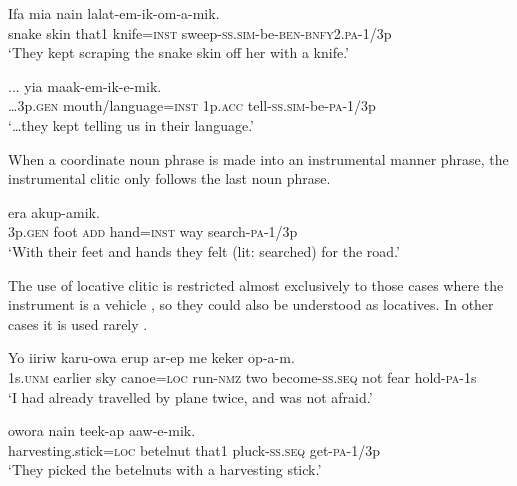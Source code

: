 \ea%
\label{ex:4:x886}
\gll Ifa  mia  nain    lalat-em-ik-om-a-mik. \\
  snake  skin  that1  knife=\textsc{inst}  sweep-\textsc{ss}.\textsc{sim}-be-\textsc{ben}-\textsc{bnfy}2.\textsc{pa}-1/3p    \\
\glt`They kept scraping the snake skin off her with a knife.'
\z

\ea%
\label{ex:4:x889}
\gll ...   yia  maak-em-ik-e-mik. \\
 {\dots}3p.\textsc{gen}  mouth/language=\textsc{inst}  1p.\textsc{acc}  tell-\textsc{ss}.\textsc{sim}-be-\textsc{pa}-1/3p     \\
\glt`{\dots}they kept telling us in their language.'
\z

When a coordinate noun phrase is made into an instrumental manner phrase, the instrumental clitic only follows the last noun phrase.

\ea%
\label{ex:4:x892}
\gll {}    era akup-amik. \\
   3p.\textsc{gen} foot \textsc{add} hand=\textsc{inst} way search-\textsc{pa}-1/3p   \\
\glt`With their feet and hands they felt (lit: searched) for the road.'
\z

The use of locative clitic is restricted almost exclusively to those cases where the instrument is a vehicle , so they could also be understood as locatives. In other cases it is used rarely .

\ea%
\label{ex:4:x887}
\gll Yo  iiriw     karu-owa  erup  ar-ep me  keker  op-a-m. \\
 1s.\textsc{unm}  earlier  sky  canoe=\textsc{loc}  run-\textsc{nmz}  two  become-\textsc{ss}.\textsc{seq}  not  fear  hold-\textsc{pa}-1s   \\
\glt`I had already travelled by plane twice, and was not afraid.'
\z

\ea%
\label{ex:4:x888}
\gll {}  owora  nain  teek-ap  aaw-e-mik. \\
  harvesting.stick=\textsc{loc}  betelnut  that1  pluck-\textsc{ss}.\textsc{seq}  get-\textsc{pa}-1/3p    \\
\glt`They picked the betelnuts with a harvesting stick.'
\z


